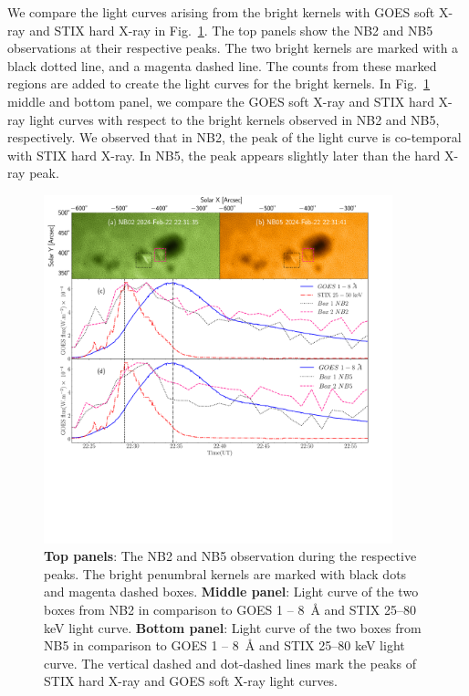 We compare the light curves arising from the bright kernels with GOES soft X-ray and STIX hard X-ray in Fig.~\ref{fig:nb2_lc}. The top panels show the NB2 and NB5 observations at their respective peaks. The two bright kernels are marked with a black dotted line, and a magenta dashed line. The counts from these marked regions are added to create the light curves for the bright kernels. In Fig.~\ref{fig:nb2_lc} middle and bottom panel, we compare the GOES soft X-ray and STIX hard X-ray light curves with respect to the bright kernels observed in NB2 and NB5, respectively. We observed that in NB2, the peak of the light curve is co-temporal with STIX hard X-ray. In NB5, the peak appears slightly later than the hard X-ray peak.  

\begin{figure}
    \centering
    \includegraphics[width=0.9\textwidth,trim={0.5cm 10cm 2cm 0.2cm},clip]{Figures/feb_22nd/nb2_nb5_ker.pdf}
    \caption[Observation of the penumbral bright kernels in NB02 and NB05]{{\bf Top panels}: The NB2 and NB5 observation during the respective peaks. The bright penumbral kernels are marked with black dots and magenta dashed boxes. {\bf Middle panel}: Light curve of the two boxes from NB2 in comparison to GOES 1 {--} 8~{\AA} and STIX 25{--}80 keV light curve. {\bf Bottom panel}: Light curve of the two boxes from NB5 in comparison to GOES 1 {--} 8~{\AA} and STIX 25{--}80 keV light curve. The vertical dashed and dot-dashed lines mark the peaks of STIX hard X-ray and GOES soft X-ray light curves.}
    \label{fig:nb2_lc}
\end{figure}

